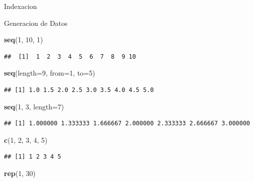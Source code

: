 \documentclass[
  ignorenonframetext,
]{beamer}
\newenvironment{Shaded}{\begin{snugshade}}{\end{snugshade}}
\newcommand{\AttributeTok}[1]{\textcolor[rgb]{0.13,0.29,0.53}{#1}}
\newcommand{\DecValTok}[1]{\textcolor[rgb]{0.00,0.00,0.81}{#1}}
\newcommand{\FunctionTok}[1]{\textcolor[rgb]{0.13,0.29,0.53}{\textbf{#1}}}
\newcommand{\NormalTok}[1]{#1}
\begin{document}
\begin{frame}[fragile]{Indexacion}
\begin{block}{Generacion de Datos}
\begin{Shaded}
\begin{Highlighting}[]
\FunctionTok{seq}\NormalTok{(}\DecValTok{1}\NormalTok{, }\DecValTok{10}\NormalTok{, }\DecValTok{1}\NormalTok{)}
\end{Highlighting}
\end{Shaded}

\begin{verbatim}
##  [1]  1  2  3  4  5  6  7  8  9 10
\end{verbatim}

\begin{Shaded}
\begin{Highlighting}[]
\FunctionTok{seq}\NormalTok{(}\AttributeTok{length=}\DecValTok{9}\NormalTok{, }\AttributeTok{from=}\DecValTok{1}\NormalTok{, }\AttributeTok{to=}\DecValTok{5}\NormalTok{)}
\end{Highlighting}
\end{Shaded}

\begin{verbatim}
## [1] 1.0 1.5 2.0 2.5 3.0 3.5 4.0 4.5 5.0
\end{verbatim}

\begin{Shaded}
\begin{Highlighting}[]
\FunctionTok{seq}\NormalTok{(}\DecValTok{1}\NormalTok{, }\DecValTok{3}\NormalTok{, }\AttributeTok{length=}\DecValTok{7}\NormalTok{)}
\end{Highlighting}
\end{Shaded}

\begin{verbatim}
## [1] 1.000000 1.333333 1.666667 2.000000 2.333333 2.666667 3.000000
\end{verbatim}

\begin{Shaded}
\begin{Highlighting}[]
\FunctionTok{c}\NormalTok{(}\DecValTok{1}\NormalTok{, }\DecValTok{2}\NormalTok{, }\DecValTok{3}\NormalTok{, }\DecValTok{4}\NormalTok{, }\DecValTok{5}\NormalTok{)}
\end{Highlighting}
\end{Shaded}

\begin{verbatim}
## [1] 1 2 3 4 5
\end{verbatim}

\begin{Shaded}
\begin{Highlighting}[]
\FunctionTok{rep}\NormalTok{(}\DecValTok{1}\NormalTok{, }\DecValTok{30}\NormalTok{)}
\end{Highlighting}
\end{Shaded}


\end{block}
\end{frame}
\end{document}
